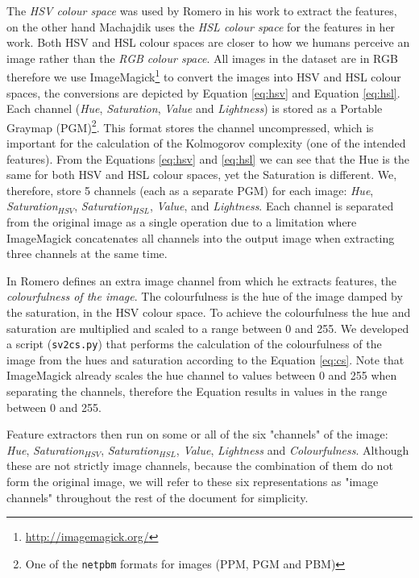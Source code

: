 \documentclass[11pt,a4paper,twoside,openright]{report}
\begin{document}
The \emph{HSV colour space} was used by Romero \cite{jma12clas} in his work to
extract the features, on the other hand Machajdik \cite{mach10clas} uses the
\emph{HSL colour space} for the features in her work.  Both HSV and HSL colour
spaces are closer to how we humans perceive an image rather than the \emph{RGB
colour space}.  All images in the dataset are in RGB therefore we use
ImageMagick\footnote{ \href{http://imagemagick.org/}{http://imagemagick.org/} }
to convert the images into HSV and HSL colour spaces, the conversions are
depicted by Equation \ref{eq:hsv} and Equation \ref{eq:hsl}.  Each channel
(\emph{Hue}, \emph{Saturation}, \emph{Value} and \emph{Lightness}) is stored as
a Portable Graymap (PGM)\footnote{One of the \texttt{netpbm} formats for images
(PPM, PGM and PBM)}.  This format stores the channel uncompressed, which is
important for the calculation of the Kolmogorov complexity (one of the intended
features).  From the Equations \ref{eq:hsv} and \ref{eq:hsl} we can see that
the Hue is the same for both HSV and HSL colour spaces, yet the Saturation is
different.  We, therefore, store 5 channels (each as a separate PGM) for each
image: \emph{Hue}, \emph{Saturation$_{HSV}$}, \emph{Saturation$_{HSL}$},
\emph{Value}, and \emph{Lightness}.  Each channel is separated from the
original image as a single operation due to a limitation where ImageMagick
concatenates all channels into the output image when extracting three channels
at the same time.

In \cite{rmc12ajs} Romero defines an extra image channel from which he extracts
features, the \emph{colourfulness of the image}.  The colourfulness is the hue
of the image damped by the saturation, in the HSV colour space.  To achieve the
colourfulness the hue and saturation are multiplied and scaled to a range
between 0 and 255.  We developed a script (\texttt{sv2cs.py}) that performs the
calculation of the colourfulness of the image from the hues and saturation
according to the Equation \ref{eq:cs}.  Note that ImageMagick already scales
the hue channel to values between 0 and 255 when separating the channels,
therefore the Equation results in values in the range between 0 and 255.

Feature extractors then run on some or all of the six "channels" of the image:
\emph{Hue}, \emph{Saturation$_{HSV}$}, \emph{Saturation$_{HSL}$}, \emph{Value},
\emph{Lightness} and \emph{Colourfulness}.  Although these are not strictly
image channels, because the combination of them do not form the original image,
we will refer to these six representations as "image channels" throughout the
rest of the document for simplicity.
\end{document}
